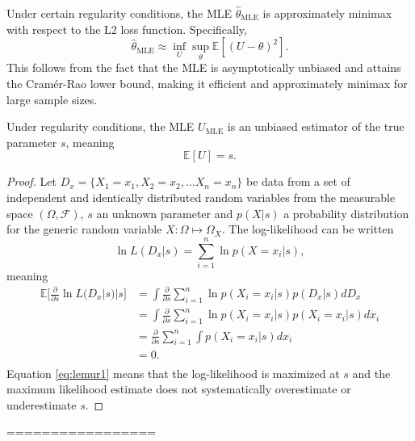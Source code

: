 \begin{corollary}
	\label{cor:mle_minimax}
	Under certain regularity conditions, the MLE \( \hat{\theta}_{\text{MLE}} \) is approximately minimax with respect to the L2 loss function. Specifically,
	\begin{equation}
		\hat{\theta}_{\text{MLE}} \approx \inf_{U}\sup_{\theta} \mathbb{E}[(U - \theta)^2].
	\end{equation}
	This follows from the fact that the MLE is asymptotically unbiased and attains the Cramér-Rao lower bound, making it efficient and approximately minimax for large sample sizes.
\end{corollary}


\begin{theorem}
	\label{thm:MLE_unbiased}
	Under regularity conditions, the MLE \( U_{\text{MLE}} \) is an unbiased estimator of the true parameter \( s \), meaning
	\begin{equation}
		\mathbb{E}[U]= s.
	\end{equation}
	
	\begin{proof}
		Let $D_x = \{X_1 = x_1,X_2 =x_2,\dots X_n=x_n\}$ be data from a set of independent and identically distributed random variables from the measurable space $(\Omega,\mathcal{F})$, $s$ an unknown parameter and $p(X|s)$ a probability distribution for the generic random variable $X:\Omega\mapsto \Omega_X$. The log-likelihood can be written
		\begin{equation}
			\ln L(D_x|s) = \sum_{i=1}^n\ln p(X = x_i|s),
		\end{equation}
		meaning
		\begin{equation}
			\label{eq:lemur1}
			\begin{split}
				\mathbb{E}\bigg[\frac{\partial}{\partial s}\ln L(D_x|s)|s\bigg] &= \int  \frac{\partial}{\partial s} \sum_{i=1}^n\ln p(X_i = x_i|s) p(D_x|s) dD_x\\
				&= \int  \frac{\partial}{\partial s} \sum_{i=1}^n\ln p(X_i = x_i|s) p(X_i=x_i|s) dx_i\\
				&= \frac{\partial}{\partial s} \sum_{i=1}^n\int  p(X_i=x_i|s) dx_i\\
				&= 0.\\
			\end{split}
		\end{equation}
		Equation \eqref{eq:lemur1} means that the log-likelihood is maximized at $s$ and the maximum likelihood estimate does not systematically overestimate or underestimate $s$.
	\end{proof}
\end{theorem}
=================















